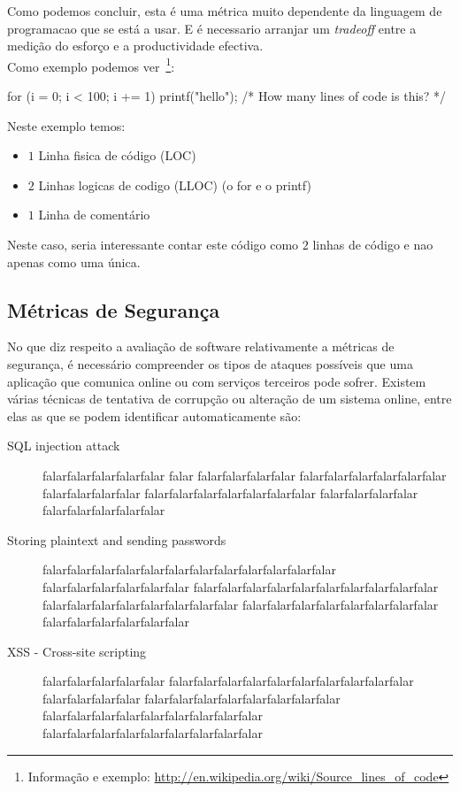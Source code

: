 Como podemos concluir, esta é uma métrica muito dependente da linguagem de programacao que se está a usar. E é necessario arranjar um 
\emph{tradeoff} entre a medição do esforço e a productividade efectiva.\\

Como exemplo podemos ver~\footnote{Informação e exemplo: \url{http://en.wikipedia.org/wiki/Source_lines_of_code}}:

\begin{code_files}
for (i = 0; i < 100; i += 1) printf("hello"); /* How many lines of code is this? */
\end{code_files}

Neste exemplo temos:

\begin{itemize}
\item $1$ Linha fisica de código (LOC)
\item $2$ Linhas logicas de codigo (LLOC) (o for e o printf)
\item $1$ Linha de comentário
\end{itemize}

Neste caso, seria interessante contar este código como $2$ linhas de código e nao apenas como uma única.

\subsection{Métricas de Segurança}

No que diz respeito a avaliação de software relativamente a métricas de segurança, é necessário compreender os tipos de ataques possíveis que uma 
aplicação que comunica online ou com serviços terceiros pode sofrer. Existem várias técnicas de tentativa de corrupção ou alteração de um sistema online, 
entre elas as que se podem identificar automaticamente são:

\begin{description}
\item[SQL injection attack] falarfalarfalarfalarfalar falar falarfalarfalarfalar falarfalarfalarfalarfalarfalar 
falarfalarfalarfalar falarfalarfalarfalarfalarfalarfalar falarfalarfalarfalar falarfalarfalarfalarfalar
\item[Storing plaintext and sending passwords] falarfalarfalarfalarfalarfalarfalarfalarfalarfalarfalarfalar
falarfalarfalarfalarfalarfalar falarfalarfalarfalarfalarfalarfalarfalarfalarfalar falarfalarfalarfalarfalarfalarfalarfalar 
falarfalarfalarfalarfalarfalarfalarfalar falarfalarfalarfalarfalarfalar
\item[XSS - Cross-site scripting] falarfalarfalarfalarfalar
falarfalarfalarfalarfalarfalarfalarfalarfalarfalar
falarfalarfalarfalar
falarfalarfalarfalarfalarfalarfalarfalar
falarfalarfalarfalarfalarfalarfalarfalarfalar
falarfalarfalarfalarfalarfalarfalarfalarfalar
\end{description}


